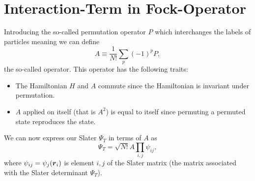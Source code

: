 
\section{Interaction-Term in Fock-Operator}
        Introducing the so-called permutation operator $P$ which interchanges
        the labels of particles meaning we can define
            \begin{equation}
                A \equiv \frac{1}{N!}\sum_p(-1)^pP,
            \end{equation}
        the so-called  operator. This operator has
        the following traits:
            \begin{itemize}
                \item The Hamiltonian $H$ and $A$ commute since the Hamiltonian
                    is invariant under permutation.
                \item $A$ applied on itself (that is $A^2$) is equal to itself
                    since permuting a permuted state reproduces the state.
            \end{itemize}
        We can now express our Slater $\Psi_T$ in terms of $A$ as
            \begin{equation}
                \Psi_T = \sqrt{N!}A\prod_{i,j}\psi_{ij},
            \end{equation}
        where $\psi_{ij}=\psi_j(\boldsymbol{{r}}_i)$ is element $i,j$ of the Slater
        matrix (the matrix associated with the Slater determinant $\Psi_T$).

